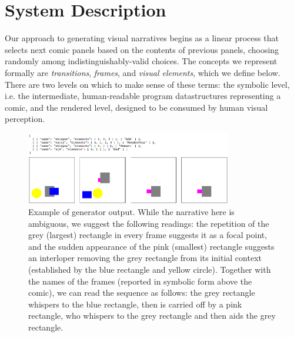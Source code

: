\section{System Description}

Our approach to generating visual narratives begins as a linear
process that selects next comic panels based on the contents of previous
panels, choosing randomly among indistinguishably-valid choices.
The concepts we represent formally are {\em transitions}, {\em frames}, and
{\em visual elements}, which we define below. There are two levels on which
to make sense of these terms: the symbolic level, i.e. the intermediate,
human-readable program datastructures representing a comic, and the
rendered level, designed to be consumed by human visual perception.

\begin{figure}[h]
\centering
\includegraphics[width=9cm]{comicgen-unconstrained-ok.png}
\caption{\small Example of generator output.
While the narrative here is ambiguous, we suggest the following readings:
the repetition of the grey (largest) rectangle in every frame suggests it
as a focal point, and the sudden appearance of the pink (smallest)
rectangle suggests an interloper removing the grey rectangle from its
initial context (established by the blue rectangle and yellow circle).
Together with the names of the frames (reported in symbolic form above the
comic), we can read the sequence as follows: the grey rectangle whispers to
the blue rectangle, then is carried off by a pink rectangle, who whispers
to the grey rectangle and then aids the grey rectangle.
}
\label{fig:out1}
\end{figure}

